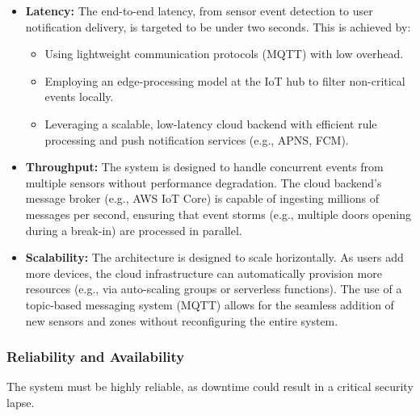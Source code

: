\documentclass[conference]{IEEEtran}
\begin{document}
\begin{itemize}
    \item \textbf{Latency:} The end-to-end latency, from sensor event detection to user notification delivery, is targeted to be under two seconds. This is achieved by:
    \begin{itemize}
        \item Using lightweight communication protocols (MQTT) with low overhead.
        \item Employing an edge-processing model at the IoT hub to filter non-critical events locally.
        \item Leveraging a scalable, low-latency cloud backend with efficient rule processing and push notification services (e.g., APNS, FCM).
    \end{itemize}
    
    \item \textbf{Throughput:} The system is designed to handle concurrent events from multiple sensors without performance degradation. The cloud backend's message broker (e.g., AWS IoT Core) is capable of ingesting millions of messages per second, ensuring that event storms (e.g., multiple doors opening during a break-in) are processed in parallel.
    
    \item \textbf{Scalability:} The architecture is designed to scale horizontally. As users add more devices, the cloud infrastructure can automatically provision more resources (e.g., via auto-scaling groups or serverless functions). The use of a topic-based messaging system (MQTT) allows for the seamless addition of new sensors and zones without reconfiguring the entire system.
\end{itemize}

\subsubsection{Reliability and Availability}
The system must be highly reliable, as downtime could result in a critical security lapse.
\end{document}
